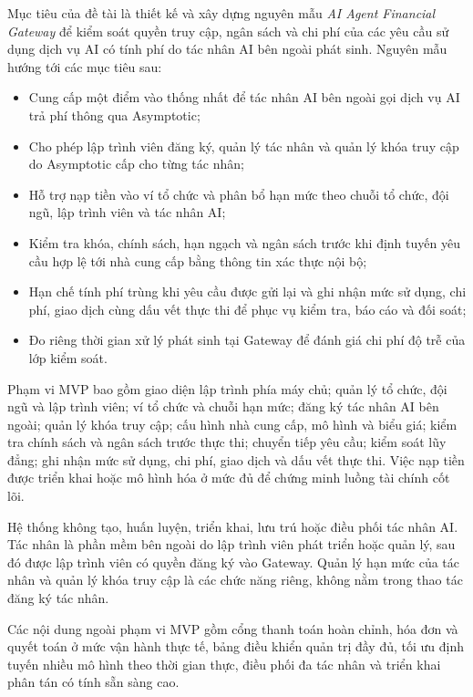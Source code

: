 Mục tiêu của đề tài là thiết kế và xây dựng nguyên mẫu \textit{AI Agent Financial Gateway} để kiểm soát quyền truy cập, ngân sách và chi phí của các yêu cầu sử dụng dịch vụ AI có tính phí do tác nhân AI bên ngoài phát sinh. Nguyên mẫu hướng tới các mục tiêu sau:

\begin{itemize}
    \item Cung cấp một điểm vào thống nhất để tác nhân AI bên ngoài gọi dịch vụ AI trả phí thông qua Asymptotic;
    \item Cho phép lập trình viên đăng ký, quản lý tác nhân và quản lý khóa truy cập do Asymptotic cấp cho từng tác nhân;
    \item Hỗ trợ nạp tiền vào ví tổ chức và phân bổ hạn mức theo chuỗi tổ chức, đội ngũ, lập trình viên và tác nhân AI;
    \item Kiểm tra khóa, chính sách, hạn ngạch và ngân sách trước khi định tuyến yêu cầu hợp lệ tới nhà cung cấp bằng thông tin xác thực nội bộ;
    \item Hạn chế tính phí trùng khi yêu cầu được gửi lại và ghi nhận mức sử dụng, chi phí, giao dịch cùng dấu vết thực thi để phục vụ kiểm tra, báo cáo và đối soát;
    \item Đo riêng thời gian xử lý phát sinh tại Gateway để đánh giá chi phí độ trễ của lớp kiểm soát.
\end{itemize}

Phạm vi MVP bao gồm giao diện lập trình phía máy chủ; quản lý tổ chức, đội ngũ và lập trình viên; ví tổ chức và chuỗi hạn mức; đăng ký tác nhân AI bên ngoài; quản lý khóa truy cập; cấu hình nhà cung cấp, mô hình và biểu giá; kiểm tra chính sách và ngân sách trước thực thi; chuyển tiếp yêu cầu; kiểm soát lũy đẳng; ghi nhận mức sử dụng, chi phí, giao dịch và dấu vết thực thi. Việc nạp tiền được triển khai hoặc mô hình hóa ở mức đủ để chứng minh luồng tài chính cốt lõi.

Hệ thống không tạo, huấn luyện, triển khai, lưu trú hoặc điều phối tác nhân AI. Tác nhân là phần mềm bên ngoài do lập trình viên phát triển hoặc quản lý, sau đó được lập trình viên có quyền đăng ký vào Gateway. Quản lý hạn mức của tác nhân và quản lý khóa truy cập là các chức năng riêng, không nằm trong thao tác đăng ký tác nhân.

Các nội dung ngoài phạm vi MVP gồm cổng thanh toán hoàn chỉnh, hóa đơn và quyết toán ở mức vận hành thực tế, bảng điều khiển quản trị đầy đủ, tối ưu định tuyến nhiều mô hình theo thời gian thực, điều phối đa tác nhân và triển khai phân tán có tính sẵn sàng cao.

